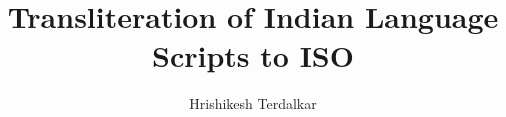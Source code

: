 \documentclass[10pt]{article}
\title{Transliteration of Indian Language Scripts to ISO}
\author{Hrishikesh Terdalkar}
\date{}
\begin{document}
\maketitle







\pagebreak

\nocite{*}



\end{document}
